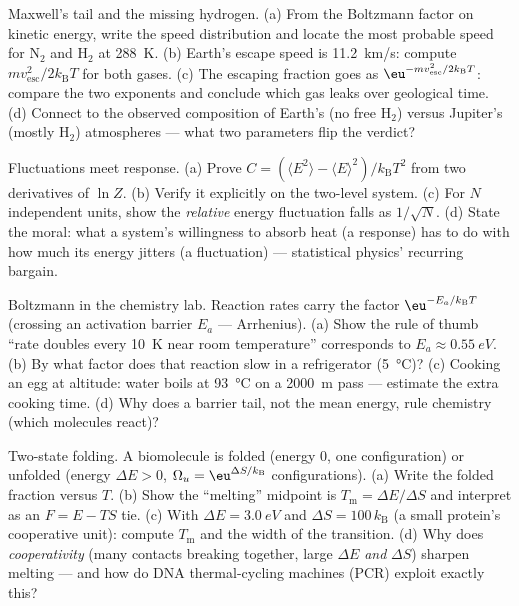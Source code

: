 \begin{exercise}[$\star\star$]\label{exo:b3:canonical-ensemble:7}
Maxwell's tail and the missing hydrogen. (a) From the Boltzmann
factor on kinetic energy, write the speed distribution and locate
the most probable speed for N$_2$ and H$_2$ at \qty{288}{K}. (b)
Earth's escape speed is \qty{11.2}{km/s}: compute
$mv_{\text{esc}}^2/2k_{\text{B}}T$ for both gases. (c) The escaping
fraction goes as $\eu^{-mv_{\text{esc}}^2/2k_{\text{B}}T}$: compare
the two exponents and conclude which gas leaks over geological
time. (d) Connect to the observed composition of Earth's (no free
H$_2$) versus Jupiter's (mostly H$_2$) atmospheres --- what two
parameters flip the verdict?
\end{exercise}

\begin{exercise}[$\star\star$]\label{exo:b3:canonical-ensemble:8}
Fluctuations meet response. (a) Prove $C = (\langle E^2\rangle -
\langle E\rangle^2)/k_{\text{B}}T^2$ from two derivatives of $\ln
Z$. (b) Verify it explicitly on the two-level system. (c) For $N$
independent units, show the \emph{relative} energy fluctuation
falls as $1/\sqrt N$. (d) State the moral: what a system's
willingness to absorb heat (a response) has to do with how much
its energy jitters (a fluctuation) --- statistical physics'
recurring bargain.
\end{exercise}

\begin{exercise}[$\star\star$]\label{exo:b3:canonical-ensemble:9}
Boltzmann in the chemistry lab. Reaction rates carry the factor
$\eu^{-E_a/k_{\text{B}}T}$ (crossing an activation barrier $E_a$
--- Arrhenius). (a) Show the rule of thumb ``rate doubles every
\qty{10}{K} near room temperature'' corresponds to $E_a \approx
\qty{0.55}{eV}$. (b) By what factor does that reaction slow in a
refrigerator (\qty{5}{\celsius})? (c) Cooking an egg at altitude:
water boils at \qty{93}{\celsius} on a \qty{2000}{m} pass ---
estimate the extra cooking time. (d) Why does a barrier tail,
not the mean energy, rule chemistry (which molecules react)?
\end{exercise}

\begin{exercise}[$\star\star\star$]\label{exo:b3:canonical-ensemble:10}
Two-state folding. A biomolecule is folded (energy $0$, one
configuration) or unfolded (energy $\Delta E > 0$, $\Omega_u =
\eu^{\Delta S/k_{\text{B}}}$ configurations). (a) Write the folded
fraction versus $T$. (b) Show the ``melting'' midpoint is
$T_{\text{m}} = \Delta E/\Delta S$ and interpret as an $F = E -
TS$ tie. (c) With $\Delta E = \qty{3.0}{eV}$ and $\Delta S =
100\,k_{\text{B}}$ (a small protein's cooperative unit): compute
$T_{\text{m}}$ and the width of the transition. (d) Why does
\emph{cooperativity} (many contacts breaking together, large
$\Delta E$ \emph{and} $\Delta S$) sharpen melting --- and how do
DNA thermal-cycling machines (PCR) exploit exactly this?
\end{exercise}

